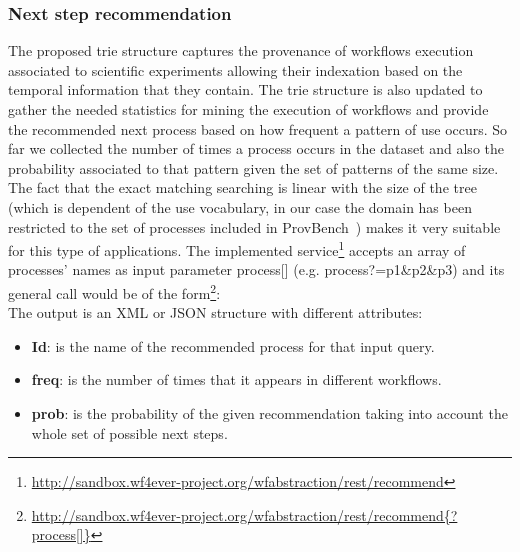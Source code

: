 \subsubsection{Next step recommendation}
The proposed trie structure captures the provenance of workflows execution associated to scientific experiments allowing
their indexation based on the temporal information that they contain. The trie structure is also updated to gather
the needed statistics for mining the execution of workflows and provide the recommended next process based on how frequent a pattern of use occurs. So far we collected the number of times a process occurs in the dataset and also the probability associated to that pattern given the set of patterns of the same size. The fact that the exact matching searching is linear with the size of the tree (which is dependent of the use vocabulary, in our case the domain has been restricted to the set of processes included in ProvBench~\cite{khalid_13}) makes it very suitable for 
this type of applications. The implemented service\footnote{\url{http://sandbox.wf4ever-project.org/wfabstraction/rest/recommend}} accepts an array of processes' names as input parameter process[] (e.g. process?=p1\&p2\&p3) and its general call would be of the form\footnote{\url{http://sandbox.wf4ever-project.org/wfabstraction/rest/recommend{?process[]}}}: \\

The output is an XML or JSON structure with different attributes:
\begin{itemize}
\item \textbf{Id}: is the name of the recommended process for that input query.
\item \textbf{freq}:  is the number of times that it appears in different workflows.
\item \textbf{prob}:  is the probability of the given recommendation taking into account the whole set of possible next steps.
\end{itemize}
